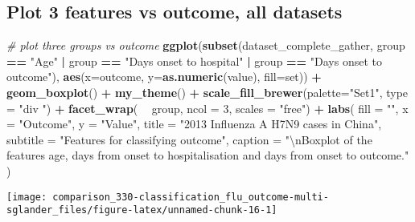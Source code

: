 \documentclass[]{book}
\newenvironment{Shaded}{\begin{snugshade}}{\end{snugshade}}
\newcommand{\CharTok}[1]{\textcolor[rgb]{0.31,0.60,0.02}{#1}}
\newcommand{\CommentTok}[1]{\textcolor[rgb]{0.56,0.35,0.01}{\textit{#1}}}
\newcommand{\DataTypeTok}[1]{\textcolor[rgb]{0.13,0.29,0.53}{#1}}
\newcommand{\DecValTok}[1]{\textcolor[rgb]{0.00,0.00,0.81}{#1}}
\newcommand{\KeywordTok}[1]{\textcolor[rgb]{0.13,0.29,0.53}{\textbf{#1}}}
\newcommand{\NormalTok}[1]{#1}
\newcommand{\OperatorTok}[1]{\textcolor[rgb]{0.81,0.36,0.00}{\textbf{#1}}}
\newcommand{\StringTok}[1]{\textcolor[rgb]{0.31,0.60,0.02}{#1}}
\begin{document}
\hypertarget{plot-3-features-vs-outcome-all-datasets}{%
\subsection{Plot 3 features vs outcome, all datasets}\label{plot-3-features-vs-outcome-all-datasets}}

\begin{Shaded}
\begin{Highlighting}[]
\CommentTok{# plot three groups vs outcome}
\KeywordTok{ggplot}\NormalTok{(}\KeywordTok{subset}\NormalTok{(dataset_complete_gather, }
\NormalTok{              group }\OperatorTok{==}\StringTok{ "Age"} \OperatorTok{|}\StringTok{ }
\StringTok{              }\NormalTok{group }\OperatorTok{==}\StringTok{ "Days onset to hospital"} \OperatorTok{|}\StringTok{ }
\StringTok{              }\NormalTok{group }\OperatorTok{==}\StringTok{ "Days onset to outcome"}\NormalTok{), }
       \KeywordTok{aes}\NormalTok{(}\DataTypeTok{x=}\NormalTok{outcome, }\DataTypeTok{y=}\KeywordTok{as.numeric}\NormalTok{(value), }\DataTypeTok{fill=}\NormalTok{set)) }\OperatorTok{+}\StringTok{ }
\StringTok{  }\KeywordTok{geom_boxplot}\NormalTok{() }\OperatorTok{+}
\StringTok{  }\KeywordTok{my_theme}\NormalTok{() }\OperatorTok{+}
\StringTok{  }\KeywordTok{scale_fill_brewer}\NormalTok{(}\DataTypeTok{palette=}\StringTok{"Set1"}\NormalTok{, }\DataTypeTok{type =} \StringTok{"div "}\NormalTok{) }\OperatorTok{+}
\StringTok{  }\KeywordTok{facet_wrap}\NormalTok{( }\OperatorTok{~}\StringTok{ }\NormalTok{group, }\DataTypeTok{ncol =} \DecValTok{3}\NormalTok{, }\DataTypeTok{scales =} \StringTok{"free"}\NormalTok{) }\OperatorTok{+}
\StringTok{  }\KeywordTok{labs}\NormalTok{(}
    \DataTypeTok{fill =} \StringTok{""}\NormalTok{,}
    \DataTypeTok{x =} \StringTok{"Outcome"}\NormalTok{,}
    \DataTypeTok{y =} \StringTok{"Value"}\NormalTok{,}
    \DataTypeTok{title =} \StringTok{"2013 Influenza A H7N9 cases in China"}\NormalTok{,}
    \DataTypeTok{subtitle =} \StringTok{"Features for classifying outcome"}\NormalTok{,}
    \DataTypeTok{caption =} \StringTok{"}\CharTok{\textbackslash{}n}\StringTok{Boxplot of the features age, days from onset to }
\StringTok{    hospitalisation and days from onset to outcome."}
\NormalTok{  )}
\end{Highlighting}
\end{Shaded}

\begin{center}\texttt{[image: comparison\_330-classification\_flu\_outcome-multi-sglander\_files/figure-latex/unnamed-chunk-16-1]} \end{center}
\end{document}
